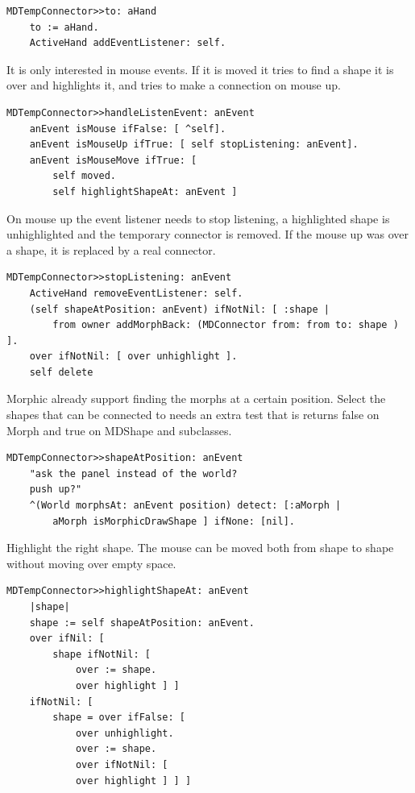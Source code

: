 \documentclass[10pt]{article}   	%
\begin{document}
\begin{verbatim}
MDTempConnector>>to: aHand
    to := aHand.
    ActiveHand addEventListener: self.
\end{verbatim}
It is only interested in mouse events. If it is moved it tries to find
a shape it is over and highlights it, and tries to make a connection 
on mouse up.
\begin{verbatim}
MDTempConnector>>handleListenEvent: anEvent
    anEvent isMouse ifFalse: [ ^self].
    anEvent isMouseUp ifTrue: [ self stopListening: anEvent]. 
    anEvent isMouseMove ifTrue: [ 
        self moved.
        self highlightShapeAt: anEvent ]
\end{verbatim}
On mouse up the event listener needs to stop listening, 
a highlighted shape is unhighlighted and the
temporary connector is removed. If the mouse up was over
a shape, it is replaced by a real connector.
\begin{verbatim}
MDTempConnector>>stopListening: anEvent
    ActiveHand removeEventListener: self.
    (self shapeAtPosition: anEvent) ifNotNil: [ :shape |
        from owner addMorphBack: (MDConnector from: from to: shape ) ].
    over ifNotNil: [ over unhighlight ].
    self delete
\end{verbatim}	
Morphic already support finding the morphs at a certain 
position. Select the shapes that can be connected to needs
an extra test that is returns false on Morph and true on
MDShape and subclasses.
\begin{verbatim}
MDTempConnector>>shapeAtPosition: anEvent
    "ask the panel instead of the world? 
    push up?"
    ^(World morphsAt: anEvent position) detect: [:aMorph |
        aMorph isMorphicDrawShape ] ifNone: [nil].
\end{verbatim}	
Highlight the right shape. The mouse can be moved 
both from shape to shape without moving over empty space.
\begin{verbatim}
MDTempConnector>>highlightShapeAt: anEvent
    |shape|
    shape := self shapeAtPosition: anEvent.
    over ifNil: [ 
        shape ifNotNil: [ 
            over := shape.
            over highlight ] ]
    ifNotNil: [ 
        shape = over ifFalse: [ 
            over unhighlight.
            over := shape.
            over ifNotNil: [  
            over highlight ] ] ]
\end{verbatim}	
\end{document}
